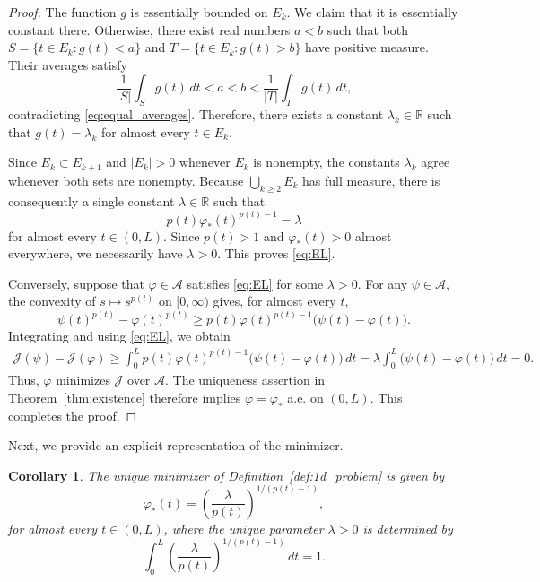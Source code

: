 \documentclass[12pt]{amsart}
\numberwithin{equation}{section}
\theoremstyle{plain}
\newtheorem{corollary}[equation]{Corollary}
\theoremstyle{definition}
\begin{document}
\begin{proof}
The function $g$ is essentially bounded on $E_k$. We claim that it is
essentially constant there. Otherwise, there exist real numbers
$a<b$ such that both
$S=\{t\in E_k:g(t)<a\}$
and
$T=\{t\in E_k:g(t)>b\}$
have positive measure. Their averages satisfy
\begin{equation*}
\frac{1}{|S|}\int_Sg(t)\,dt<a<b
<
\frac{1}{|T|}\int_Tg(t)\,dt,
\end{equation*}
contradicting \eqref{eq:equal_averages}. Therefore, there exists a
constant $\lambda_k\in\mathbb R$ such that $g(t)=\lambda_k$ for almost every $t\in E_k$.

Since $E_k\subset E_{k+1}$ and $|E_k|>0$ whenever $E_k$ is nonempty,
the constants $\lambda_k$ agree whenever both sets are nonempty.
Because $\bigcup_{k\ge2}E_k$ has full measure, there is consequently
a single constant $\lambda\in\mathbb R$ such that
\begin{equation*}
p(t)\varphi_*(t)^{p(t)-1}
=
\lambda
\end{equation*}
for almost every $t\in(0,L)$.
Since $p(t)>1$ and $\varphi_*(t)>0$
almost everywhere, we necessarily have $\lambda>0$.
This proves \eqref{eq:EL}.

Conversely, suppose that $\varphi\in\mathcal A$ satisfies
\eqref{eq:EL} for some $\lambda>0$. For any $\psi\in\mathcal A$, the
convexity of $s\mapsto s^{p(t)}$ on $[0,\infty)$ gives, for almost every
$t$,
\begin{equation*}
\psi(t)^{p(t)}
-
\varphi(t)^{p(t)}
\ge
p(t)\varphi(t)^{p(t)-1}
\bigl(\psi(t)-\varphi(t)\bigr).
\end{equation*}
Integrating and using \eqref{eq:EL}, we obtain
\begin{align*}
\mathcal J(\psi)-\mathcal J(\varphi)
\ge
\int_0^L
p(t)\varphi(t)^{p(t)-1}
\bigl(\psi(t)-\varphi(t)\bigr)\,dt
=
\lambda
\int_0^L
\bigl(\psi(t)-\varphi(t)\bigr)\,dt
=
0.
\end{align*}
Thus, $\varphi$ minimizes $\mathcal J$ over $\mathcal A$. The uniqueness
assertion in Theorem~\ref{thm:existence} therefore implies $\varphi=\varphi_*$ a.e. on $(0,L)$.
This completes the proof.
\end{proof}

Next, we provide an explicit representation of the minimizer.
\begin{corollary}
\label{cor:explicit}
The unique minimizer of Definition~\ref{def:1d_problem} is given by
\begin{equation}
\label{eq:explicit}
\varphi_*(t)
=
\left(
\frac{\lambda}{p(t)}
\right)^{1/(p(t)-1)},
\end{equation}
for almost every $t\in(0,L)$,
where the unique parameter $\lambda>0$ is determined by
\begin{equation}
\label{eq:lambda}
\int_0^L
\left(
\frac{\lambda}{p(t)}
\right)^{1/(p(t)-1)}
\,dt
=
1.
\end{equation}
\end{corollary}
\end{document}
